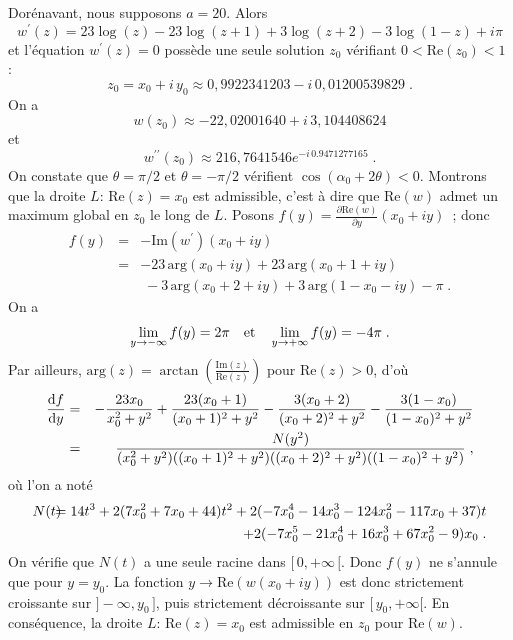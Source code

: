 \documentclass[12pt]{article}
\newcommand{\al}{\alpha}
\newcommand{\io}{+\infty}
\newcommand{\lm}{\left}
\newcommand{\rt}{\right}
\begin{document}
Dor\'enavant, nous supposons $a=20$. Alors
$$
w^{\prime}(z)=23\log(z)-23\log(z+1)+3\log(z+2)-3\log(1-z)+i\pi
$$
et l'\'equation $w^{\prime}(z)=0$ poss\`ede une seule solution $z_0$ 
v\'erifiant
$0<\text{Re}(z_0)<1$ :
$$
z_0=x_0+i\,y_0\approx 0,9922341203-i\,0,01200539829\;.
$$
On a
$$
w(z_0)\approx -22,02001640+i\,3,104408624$$
et
$$
w^{\prime\prime}(z_0)\approx 216,7641546e^{-i\,0.9471277165}\;.
$$
On constate que $\theta=\pi/2$ et $\theta=-\pi/2$ v\'erifient
$\cos(\al_0+2\theta)<0$. Montrons que la droite $L:\,\text{Re}(z)=x_0$
est admissible, c'est \`a dire que $\text{Re}(w)$ admet un maximum global
en $z_0$ le long de $L$. Posons $f(y)=\frac{\partial 
\text{Re}(w)}{\partial y}(x_0+iy)$~; donc
\begin{eqnarray*}
f(y)&=&-\text{Im}(w^{\prime})(x_0+iy)\\
&=&-23\,\text{arg}(x_0+iy)+23\,\text{arg}(x_0+1+iy)\\
&&\;-3\,\text{arg}(x_0+2+iy)+3\,\text{arg}(1-x_0-iy)-\pi\;.
\end{eqnarray*}
On a
$$
\lim_{y\to -\infty}f(y)=2\pi\quad\hbox{et}\quad\lim_{y\to +\infty}f(y)=-4\pi\;.
$$
Par ailleurs, $\text{arg}(z)=\arctan\lm(\frac{\text{Im}(z)}{\text{Re}(z)}\rt)$
pour $\text{Re}(z)>0$, d'o\`u
\begin{eqnarray*}
\frac{\textup{d}f}{\textup{d}y}&=&-\frac{23x_0}{x_0^2+y^2}+\frac{23(x_ 
0+1)}{(x_0+1)^2+y^2}
-\frac{3(x_0+2)}{(x_0+2)^2+y^2}-\frac{3(1-x_0)}{(1-x_0)^2+y^2}\\
&=&\frac{N(y^2)}{(x_0^2+y^2)((x_0+1)^2+y^2)((x_0+2)^2+y^2)((1-x_0)^2+y^2)}\;,
\end{eqnarray*}
o\`u l'on a not\'e
\begin{eqnarray*}
N(t)\hskip -7pt&=&\hskip -7pt14t^3+2(7x_0^2+7x_0+44)t^2
+2(-7x_0^4-14x_0^3-124x_0^2-117x_0+37)t
\\&&+2(-7x_0^5-21x_0^4+16x_0^3+67x_0^2-9)x_0\;.
\end{eqnarray*}
On v\'erifie que $N(t)$ a une seule racine dans $[\,0,\io\,[$. Donc
$f(y)$ ne s'annule que pour $y=y_0$. La fonction
$y\to \text{Re}(w(x_0+iy))$ est donc strictement
croissante sur $]-\infty, y_0\,]$, puis strictement
d\'ecroissante sur $[\,y_0,+\infty[$. En cons\'equence,
la droite $L:\,\text{Re}(z)=x_0$ est admissible en $z_0$ pour $\text{Re}(w)$.\\
\end{document}

